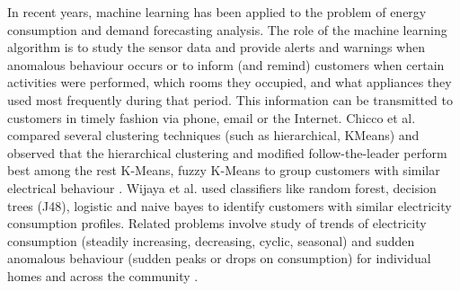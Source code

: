 \documentclass{acm_proc_article-sp}
\begin{document}
In recent years, machine learning has been applied to the problem of energy consumption and demand forecasting analysis. The role of the machine learning algorithm is to study the sensor data and provide alerts and warnings when anomalous behaviour occurs or to inform (and remind) customers when certain activities were performed, which rooms they occupied, and what appliances they used most frequently during that period. This information can be transmitted to customers in timely fashion via phone, email or the Internet.
Chicco et al. \cite{1626400} compared several clustering techniques (such as hierarchical, KMeans) and observed that the hierarchical clustering and modified follow-the-leader perform best among the rest K-Means, fuzzy K-Means to group customers with similar electrical behaviour \cite{5620917}. Wijaya et al. \cite{Wijaya} used classifiers like random forest, decision trees (J48), logistic and naive bayes to identify customers with similar electricity consumption profiles.
Related problems involve study of trends of electricity consumption (steadily increasing, decreasing, cyclic, seasonal) and sudden anomalous behaviour (sudden peaks or drops on consumption) for individual homes and across the community \cite{Diane}.
\end{document}
